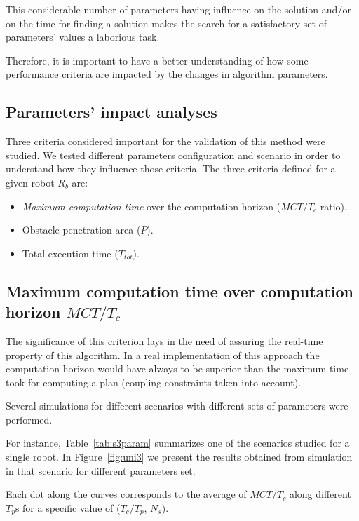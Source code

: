 \documentclass[eprint]{actapoly}
\begin{document}
This considerable number of parameters having influence on the solution
and/or on the time for finding a solution makes the search for a
satisfactory set of parameters' values a laborious task.

Therefore, it is important to have a better understanding of how some
performance criteria are impacted by the changes in algorithm
parameters.

\subsection{Parameters' impact analyses}

Three criteria considered important for the validation of this method were studied.
We tested different parameters configuration and scenario in order to 
understand how they influence
those criteria.
The three criteria defined for a given robot $R_b$ are:

\begin{itemize}

\item
\textit{Maximum computation time} over the computation horizon ($MCT/T_c$ 
ratio).

\item
Obstacle penetration area ($P$).

\item
Total execution time ($T_{tot}$).

\end{itemize}

\subsection{Maximum computation time over computation horizon $MCT/T_c$}

The significance of this criterion lays in the need of assuring the 
real-time property of this algorithm.
In a real implementation of this approach the computation horizon would have 
always to be superior than the
maximum time took for computing a plan (coupling constraints
taken into account).

Several simulations for different scenarios with different sets of parameters were
performed.

For instance, Table~\ref{tab:s3param} summarizes one of the scenarios studied for a 
single robot. In Figure~\ref{fig:uni3} we present the results obtained from simulation in that scenario for different parameters set.

Each dot along the curves corresponds to the average of $MCT/T_c$ along different $T_p$s for a specific value of ($T_c/T_p$, $N_s$).
\end{document}
